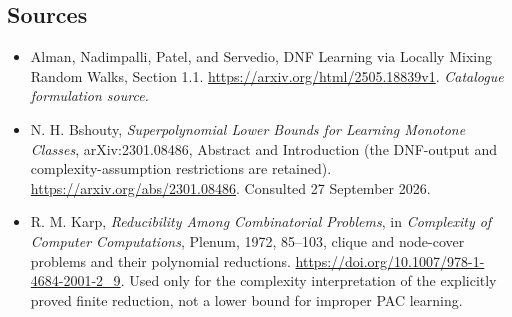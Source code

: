 \documentclass[11pt,a4paper]{article}
\numberwithin{equation}{section}
\begin{document}
\subsection{Sources}
\begin{itemize}\raggedright
\item[\textnormal{[S1]}]\hypertarget{source:219:1}{} Alman, Nadimpalli, Patel, and Servedio, DNF Learning via Locally Mixing Random Walks, Section 1.1.
\url{https://arxiv.org/html/2505.18839v1}.
{\small\textit{Catalogue formulation source.}}
\item[\textnormal{[E1]}]\hypertarget{extra:219:1}{}
N. H. Bshouty, \emph{Superpolynomial Lower Bounds for Learning Monotone
Classes}, arXiv:2301.08486, Abstract and Introduction (the DNF-output
and complexity-assumption restrictions are retained).
\url{https://arxiv.org/abs/2301.08486}. Consulted 27 September 2026.
\item[\textnormal{[E2]}]\hypertarget{extra:219:2}{}
R. M. Karp, \emph{Reducibility Among Combinatorial Problems}, in
\emph{Complexity of Computer Computations}, Plenum, 1972, 85--103,
clique and node-cover problems and their polynomial reductions.
\url{https://doi.org/10.1007/978-1-4684-2001-2_9}.
Used only for the complexity interpretation of the explicitly proved
finite reduction, not a lower bound for improper PAC learning.
\end{itemize}
\end{document}
